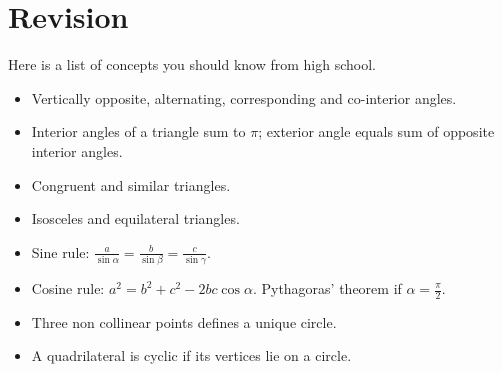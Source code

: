 \section{Revision}

Here is a list of concepts you should know from high school.

\begin{itemize}
    \item Vertically opposite, alternating, corresponding and co-interior angles.
    \item Interior angles of a triangle sum to \(\pi\); exterior angle equals sum of opposite interior angles.
    \item Congruent and similar triangles.
    \item Isosceles and equilateral triangles.
    \item Sine rule: \(\frac{a}{\sin \alpha} = \frac{b}{\sin \beta} = \frac{c}{\sin \gamma}\).
    \item Cosine rule: \(a^2 = b^2 + c^2 - 2bc \cos \alpha\). Pythagoras' theorem if \(\alpha = \frac{\pi}{2}\).
    \item Three non collinear points defines a unique circle.
    \item A quadrilateral is cyclic if its vertices lie on a circle.
\end{itemize}